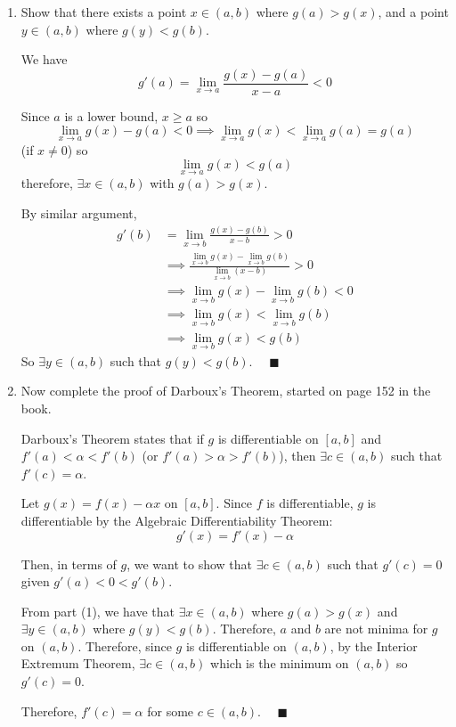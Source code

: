 \documentclass[12pt]{article}
\newcommand{\qed}{\quad \blacksquare}
\begin{document}
\begin{enumerate}
	\item Show that there exists a point $x\in(a,b)$ where $g(a)>g(x)$, and a point $y\in(a,b)$ where $g(y)<g(b)$.
	
        \color{blue}
            We have 
            \[g'(a) = \lim_{x \to a} \frac{g(x) - g(a)}{x - a} < 0\]

            Since $a$ is a lower bound, $x \geq a$ so 
            \[\lim_{x \to a} g(x) - g(a) < 0 \implies \lim_{x \to a} g(x) < \lim_{x \to a} g(a) = g(a)\] 
            (if $x \neq 0$) so 
            \[\lim_{x \to a} g(x) < g(a)\]
            therefore, $\exists x \in (a, b)$ with $g(a) > g(x)$. 

            By similar argument, 
            \begin{align*}
                g'(b) &= \lim_{x \to b} \frac{g(x) - g(b)}{x - b} > 0\\ 
                &\implies \frac{\lim_{x \to b} g(x) - \lim_{x \to b} g(b)}{\lim_{x \to b} (x - b)} > 0\\ 
                &\implies \lim_{x \to b} g(x) - \lim_{x \to b} g(b) < 0\\ 
                &\implies \lim_{x \to b} g(x) < \lim_{x \to b} g(b)\\ 
                &\implies \lim_{x \to b} g(x) < g(b)
            \end{align*}
            So $\exists y \in (a, b)$ such that $g(y) < g(b)$. $\qed$
        \color{black}

	\item Now complete the proof of Darboux's Theorem, started on page 152 in the book.
	
        \color{blue}
            Darboux's Theorem states that if $g$ is differentiable on $[a, b]$ and $f'(a) < \alpha < f'(b)$ (or $f'(a) > \alpha > f'(b)$), then $\exists c \in (a, b)$ such that $f'(c) = \alpha$.

            Let $g(x) = f(x) - \alpha x$ on $[a, b]$. Since $f$ is differentiable, $g$ is differentiable by the Algebraic Differentiability Theorem: 
            \[g'(x) = f'(x) - \alpha\]

            Then, in terms of $g$, we want to show that $\exists c \in (a, b)$ such that $g'(c) = 0$ given $g'(a) < 0 < g'(b)$.

            From part (1), we have that $\exists x \in (a, b)$ where $g(a) > g(x)$ and $\exists y \in (a, b)$ where $g(y) < g(b)$. Therefore, $a$ and $b$ are not minima for $g$ on $(a, b)$. Therefore, since $g$ is differentiable on $(a, b)$, by the Interior Extremum Theorem, $\exists c \in (a, b)$ which is the minimum on $(a, b)$ so $g'(c) = 0$.

            Therefore, $f'(c) = \alpha$ for some $c \in (a, b)$. $\qed$
        \color{black}

\end{enumerate}
\end{document}
